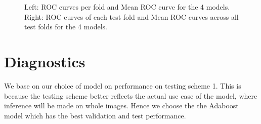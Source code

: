 \documentclass[11pt, letterpaper, journal]{IEEEtran}
\begin{document}
\begin{figure}%
    \centering
    \qquad
    \caption{Left: ROC curves per fold and Mean ROC curve for the 4 models. Right: ROC curves of each test fold and Mean ROC curves across all test folds for the 4 models. }%
    \label{fig:ROC_curves scheme2}%
\end{figure}


\section{Diagnostics}
We base on our choice of model on performance on testing scheme 1. This is because the testing scheme better reflects the actual use case of the model, where inference will be made on whole images. Hence we choose the the Adaboost model which has the best validation and test performance. 
\end{document}
